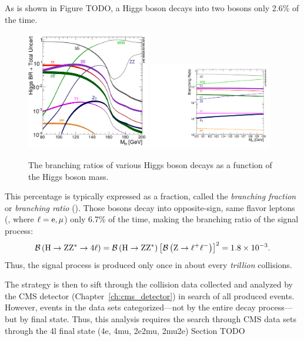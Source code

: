 As is shown in Figure TODO, a Higgs boson decays into two \PZ bosons only 2.6\% of the time.
\begin{figure}[!htbp]
    \begin{center}
		\includegraphics[width=0.48\textwidth]{figures/higgsmassmeas/higgs_BR_80to200GeV.pdf}
		\includegraphics[width=0.48\textwidth]{figures/higgsmassmeas/higgs_BR_120to130GeV.pdf}
		\caption{The branching ratios of various Higgs boson decays as a function of the Higgs boson mass.}
		\label{fig:higgs_br}
	\end{center}
\end{figure}
This percentage is typically expressed as a fraction, called the \emph{branching fraction} or \emph{branching ratio} (\br).
Those \PZ bosons decay into opposite-sign, same flavor leptons (\Ztolplm, where $\ell = \mathrm{e}, \mu$) only 6.7\% of the time, making the branching ratio of the signal process: %
\begin{equation*}
    \BRof{\hzzfourl} = \BRof{\htozz} \left[ \BRof{\Ztolplm} \right]^2 = 1.8\tentotheminus{3}.
\end{equation*}
Thus, the signal process is produced only once in about every \emph{trillion} \pp collisions.

The strategy is then to sift through the \pp collision data collected and analyzed by the CMS detector (Chapter~\ref{ch:cms_detector}) in search of all produced \hzzfourl events.
However, events in the data sets categorized---not by the entire decay process---but by final state.
Thus, this analysis requires the search through CMS data sets through the 4l final state (4e, 4mu, 2e2mu, 2mu2e) Section TODO%

